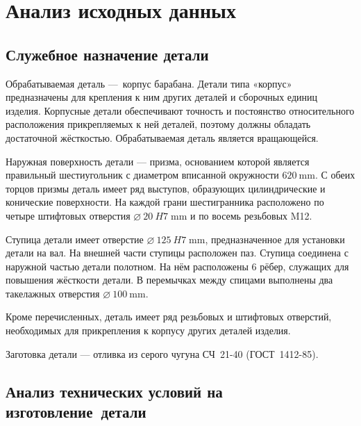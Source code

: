 \documentclass[14pt,russian,a4paper]{extreport}
\begin{document}



\setcounter{page}{3}

\tableofcontents

\chapter{Анализ исходных данных}

\section{Служебное назначение детали}

Обрабатываемая деталь --- корпус барабана. Детали типа «корпус» предназначены для крепления к ним других деталей и сборочных единиц изделия. Корпусные детали обеспечивают точность и постоянство относительного расположения прикрепляемых к ней деталей, поэтому должны обладать достаточной жёсткостью. Обрабатываемая деталь является вращающейся.\par

Наружная поверхность детали --- призма, основанием которой является правильный шестиугольник с диаметром вписанной окружности $\SI{620}{\milli\meter}$. С обеих торцов призмы деталь имеет ряд выступов, образующих цилиндрические и конические поверхности. На каждой грани шестигранника расположено по четыре штифтовых отверстия $\SI{20}[\diameter]{H7 \; \milli\meter}$ и по восемь резьбовых M12. \par

Ступица детали имеет отверстие $\SI{125}[\diameter]{H7 \; \milli\meter}$, предназначенное для ус\-тановки детали на вал. На внешней части ступицы расположен паз. Ступица соединена с наружной частью детали полотном. На нём расположены 6 рёбер, служащих для повышения жёсткости детали. В перемычках между спицами выполнены два такелажных отверстия $\SI{100}[\diameter]{\milli\meter}$.  \par

Кроме перечисленных, деталь имеет ряд резьбовых и штифтовых отверстий, необходимых для прикрепления к корпусу других деталей изделия. \par

Заготовка детали --- отливка из серого чугуна СЧ~21-40 (ГОСТ~1412-85). \par



\section{Анализ технических условий на изготовление~детали}
\end{document}
